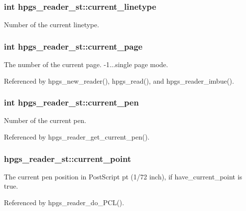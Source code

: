 \subsubsection[{current\_\-linetype}]{\setlength{\rightskip}{0pt plus 5cm}int {\bf hpgs\_\-reader\_\-st::current\_\-linetype}}\label{structhpgs__reader__st_a7bae59709584e09da7a60cb2a86ef1f7}
Number of the current linetype. 
\subsubsection[{current\_\-page}]{\setlength{\rightskip}{0pt plus 5cm}int {\bf hpgs\_\-reader\_\-st::current\_\-page}}\label{structhpgs__reader__st_a623cad219ac749b60933354b3c19ff12}
The number of the current page. -\/1...single page mode. 

Referenced by hpgs\_\-new\_\-reader(), hpgs\_\-read(), and hpgs\_\-reader\_\-imbue().

\subsubsection[{current\_\-pen}]{\setlength{\rightskip}{0pt plus 5cm}int {\bf hpgs\_\-reader\_\-st::current\_\-pen}}\label{structhpgs__reader__st_a92993b1ad64e3231a76a573a98034425}
Number of the current pen. 

Referenced by hpgs\_\-reader\_\-get\_\-current\_\-pen().

\subsubsection[{current\_\-point}]{ {\bf hpgs\_\-reader\_\-st::current\_\-point}}\label{structhpgs__reader__st_a5742512be1ab22bb26247c309cfac95e}
The current pen position in PostScript pt (1/72 inch), if {\ttfamily have\_\-current\_\-point} is true. 

Referenced by hpgs\_\-reader\_\-do\_\-PCL().

